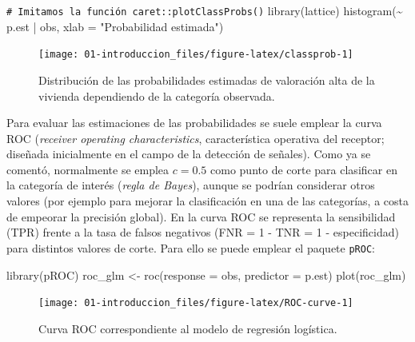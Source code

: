 \documentclass[
]{book}
\newenvironment{Shaded}{\begin{snugshade}}{\end{snugshade}}
\newcommand{\AttributeTok}[1]{\textcolor[rgb]{0.77,0.63,0.00}{#1}}
\newcommand{\CommentTok}[1]{\textcolor[rgb]{0.56,0.35,0.01}{\textit{#1}}}
\newcommand{\FunctionTok}[1]{\textcolor[rgb]{0.00,0.00,0.00}{#1}}
\newcommand{\NormalTok}[1]{#1}
\newcommand{\OtherTok}[1]{\textcolor[rgb]{0.56,0.35,0.01}{#1}}
\newcommand{\SpecialCharTok}[1]{\textcolor[rgb]{0.00,0.00,0.00}{#1}}
\newcommand{\StringTok}[1]{\textcolor[rgb]{0.31,0.60,0.02}{#1}}
\theoremstyle{break}
\theoremstyle{nonumberplain}
\renewcommand{\CommentTok}[1]{\textcolor[rgb]{0.41,0.41,0.41}{\texttt{#1}}}
\begin{document}
\begin{Shaded}
\begin{Highlighting}[]
\CommentTok{\# Imitamos la función caret::plotClassProbs()}
\FunctionTok{library}\NormalTok{(lattice) }
\FunctionTok{histogram}\NormalTok{(}\SpecialCharTok{\textasciitilde{}}\NormalTok{ p.est }\SpecialCharTok{|}\NormalTok{ obs, }\AttributeTok{xlab =} \StringTok{"Probabilidad estimada"}\NormalTok{)}
\end{Highlighting}
\end{Shaded}

\begin{figure}[!htb]

{\centering \texttt{[image: 01-introduccion\_files/figure-latex/classprob-1]} 

}

\caption{Distribución de las probabilidades estimadas de valoración alta de la vivienda dependiendo de la categoría observada.}\label{fig:classprob}
\end{figure}

Para evaluar las estimaciones de las probabilidades se suele emplear la curva ROC (\emph{receiver operating characteristics}, característica operativa del receptor; diseñada inicialmente en el campo de la detección de señales).
Como ya se comentó, normalmente se emplea \(c = 0.5\) como punto de corte para clasificar en la categoría de interés (\emph{regla de Bayes}), aunque se podrían considerar otros valores (por ejemplo para mejorar la clasificación en una de las categorías, a costa de empeorar la precisión global).
En la curva ROC se representa la sensibilidad (TPR) frente a la tasa de falsos negativos (FNR = 1 - TNR = 1 - especificidad) para distintos valores de corte.
Para ello se puede emplear el paquete \texttt{pROC}:

\begin{Shaded}
\begin{Highlighting}[]
\FunctionTok{library}\NormalTok{(pROC)}
\NormalTok{roc\_glm }\OtherTok{\textless{}{-}} \FunctionTok{roc}\NormalTok{(}\AttributeTok{response =}\NormalTok{ obs, }\AttributeTok{predictor =}\NormalTok{ p.est)}
\FunctionTok{plot}\NormalTok{(roc\_glm)}
\end{Highlighting}
\end{Shaded}

\begin{figure}[!htb]

{\centering \texttt{[image: 01-introduccion\_files/figure-latex/ROC-curve-1]} 

}

\caption{Curva ROC correspondiente al modelo de regresión logística.}\label{fig:ROC-curve}
\end{figure}
\end{document}
